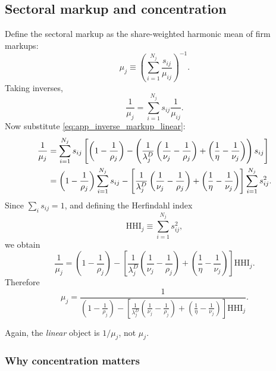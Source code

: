 \subsection{Sectoral markup and concentration}

Define the sectoral markup as the share-weighted harmonic mean of firm markups:
\begin{equation}
\mu_j
\equiv
\left(
\sum_{i=1}^{N_j} \frac{s_{ij}}{\mu_{ij}}
\right)^{-1}.
\label{eq:app_sector_harmonic}
\end{equation}
Taking inverses,
\[
\frac{1}{\mu_j}
=
\sum_{i=1}^{N_j} s_{ij} \frac{1}{\mu_{ij}}.
\]
Now substitute \eqref{eq:app_inverse_markup_linear}:
\begin{align}
\frac{1}{\mu_j}
&=
\sum_{i=1}^{N_j}
s_{ij}
\left[
\left( 1 - \frac{1}{\rho_j} \right)
-
\left(
\frac{1}{\lambda_j^D}
\left( \frac{1}{\nu_j} - \frac{1}{\rho_j} \right)
+
\left( \frac{1}{\eta} - \frac{1}{\nu_j} \right)
\right) s_{ij}
\right]
\notag \\
&=
\left( 1 - \frac{1}{\rho_j} \right) \sum_{i=1}^{N_j} s_{ij}
-
\left[
\frac{1}{\lambda_j^D}
\left( \frac{1}{\nu_j} - \frac{1}{\rho_j} \right)
+
\left( \frac{1}{\eta} - \frac{1}{\nu_j} \right)
\right]
\sum_{i=1}^{N_j} s_{ij}^2.
\label{eq:app_sector_inverse_step}
\end{align}
Since $\sum_i s_{ij} = 1$, and defining the Herfindahl index
\[
\text{HHI}_j \equiv \sum_{i=1}^{N_j} s_{ij}^2,
\]
we obtain
\begin{equation}
\frac{1}{\mu_j}
=
\left( 1 - \frac{1}{\rho_j} \right)
-
\left[
\frac{1}{\lambda_j^D}
\left( \frac{1}{\nu_j} - \frac{1}{\rho_j} \right)
+
\left( \frac{1}{\eta} - \frac{1}{\nu_j} \right)
\right]
\text{HHI}_j.
\label{eq:app_sector_inverse_markup}
\end{equation}
Therefore
\begin{equation}
\mu_j
=
\frac{1}{
\left( 1 - \frac{1}{\rho_j} \right)
-
\left[
\frac{1}{\lambda_j^D}
\left( \frac{1}{\nu_j} - \frac{1}{\rho_j} \right)
+
\left( \frac{1}{\eta} - \frac{1}{\nu_j} \right)
\right]
\text{HHI}_j
}.
\label{eq:app_sector_markup}
\end{equation}

Again, the \emph{linear} object is $1/\mu_j$, not $\mu_j$.

\subsubsection{Why concentration matters}

